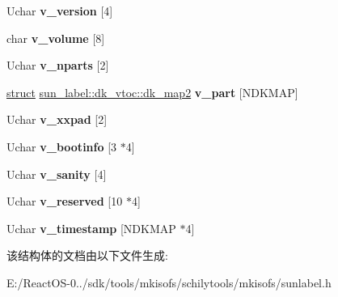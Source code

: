 \begin{DoxyCompactItemize}
\item 
\mbox{\label{structsun__label_1_1dk__vtoc_a3260d81053d22403f872e4376960c8eb}} 
Uchar {\bfseries v\+\_\+version} \mbox{[}4\mbox{]}
\item 
\mbox{\label{structsun__label_1_1dk__vtoc_a1379631f142d3327eb1616bd05960f59}} 
char {\bfseries v\+\_\+volume} \mbox{[}8\mbox{]}
\item 
\mbox{\label{structsun__label_1_1dk__vtoc_af4b5d361a210cdd683f5a6560e45acef}} 
Uchar {\bfseries v\+\_\+nparts} \mbox{[}2\mbox{]}
\item 
\mbox{\label{structsun__label_1_1dk__vtoc_a1664ff3b283666549dc70ee20d9663dc}} 
\hyperlink{interfacestruct}{struct} \hyperlink{structsun__label_1_1dk__vtoc_1_1dk__map2}{sun\+\_\+label\+::dk\+\_\+vtoc\+::dk\+\_\+map2} {\bfseries v\+\_\+part} \mbox{[}N\+D\+K\+M\+AP\mbox{]}
\item 
\mbox{\label{structsun__label_1_1dk__vtoc_af87a79b330877871940a569bde90908d}} 
Uchar {\bfseries v\+\_\+xxpad} \mbox{[}2\mbox{]}
\item 
\mbox{\label{structsun__label_1_1dk__vtoc_a75cd5b9347dcf84b9fbdb44bf37e755d}} 
Uchar {\bfseries v\+\_\+bootinfo} \mbox{[}3 $\ast$4\mbox{]}
\item 
\mbox{\label{structsun__label_1_1dk__vtoc_a55267647525d3e74706ed8f8cde14f66}} 
Uchar {\bfseries v\+\_\+sanity} \mbox{[}4\mbox{]}
\item 
\mbox{\label{structsun__label_1_1dk__vtoc_a84240bfdf402f63048bc006caf5ccc57}} 
Uchar {\bfseries v\+\_\+reserved} \mbox{[}10 $\ast$4\mbox{]}
\item 
\mbox{\label{structsun__label_1_1dk__vtoc_a21ace8b478e038bed6b644e482b0fb99}} 
Uchar {\bfseries v\+\_\+timestamp} \mbox{[}N\+D\+K\+M\+AP $\ast$4\mbox{]}
\end{DoxyCompactItemize}


该结构体的文档由以下文件生成\+:\begin{DoxyCompactItemize}
\item 
E\+:/\+React\+O\+S-\/0../sdk/tools/mkisofs/schilytools/mkisofs/sunlabel.\+h\end{DoxyCompactItemize}
